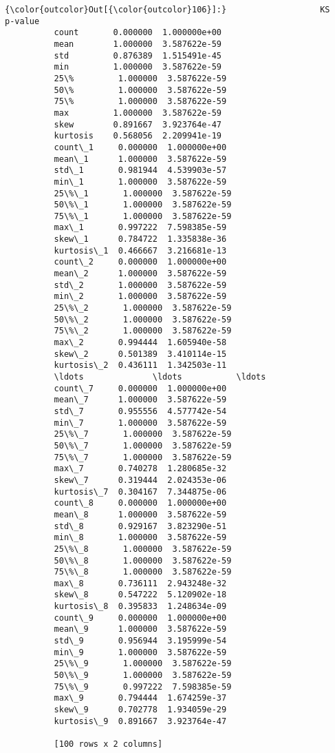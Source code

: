             \begin{Verbatim}[commandchars=\\\{\}]
{\color{outcolor}Out[{\color{outcolor}106}]:}                   KS       p-value
          count       0.000000  1.000000e+00
          mean        1.000000  3.587622e-59
          std         0.876389  1.515491e-45
          min         1.000000  3.587622e-59
          25\%         1.000000  3.587622e-59
          50\%         1.000000  3.587622e-59
          75\%         1.000000  3.587622e-59
          max         1.000000  3.587622e-59
          skew        0.891667  3.923764e-47
          kurtosis    0.568056  2.209941e-19
          count\_1     0.000000  1.000000e+00
          mean\_1      1.000000  3.587622e-59
          std\_1       0.981944  4.539903e-57
          min\_1       1.000000  3.587622e-59
          25\%\_1       1.000000  3.587622e-59
          50\%\_1       1.000000  3.587622e-59
          75\%\_1       1.000000  3.587622e-59
          max\_1       0.997222  7.598385e-59
          skew\_1      0.784722  1.335838e-36
          kurtosis\_1  0.466667  3.216681e-13
          count\_2     0.000000  1.000000e+00
          mean\_2      1.000000  3.587622e-59
          std\_2       1.000000  3.587622e-59
          min\_2       1.000000  3.587622e-59
          25\%\_2       1.000000  3.587622e-59
          50\%\_2       1.000000  3.587622e-59
          75\%\_2       1.000000  3.587622e-59
          max\_2       0.994444  1.605940e-58
          skew\_2      0.501389  3.410114e-15
          kurtosis\_2  0.436111  1.342503e-11
          \ldots              \ldots           \ldots
          count\_7     0.000000  1.000000e+00
          mean\_7      1.000000  3.587622e-59
          std\_7       0.955556  4.577742e-54
          min\_7       1.000000  3.587622e-59
          25\%\_7       1.000000  3.587622e-59
          50\%\_7       1.000000  3.587622e-59
          75\%\_7       1.000000  3.587622e-59
          max\_7       0.740278  1.280685e-32
          skew\_7      0.319444  2.024353e-06
          kurtosis\_7  0.304167  7.344875e-06
          count\_8     0.000000  1.000000e+00
          mean\_8      1.000000  3.587622e-59
          std\_8       0.929167  3.823290e-51
          min\_8       1.000000  3.587622e-59
          25\%\_8       1.000000  3.587622e-59
          50\%\_8       1.000000  3.587622e-59
          75\%\_8       1.000000  3.587622e-59
          max\_8       0.736111  2.943248e-32
          skew\_8      0.547222  5.120902e-18
          kurtosis\_8  0.395833  1.248634e-09
          count\_9     0.000000  1.000000e+00
          mean\_9      1.000000  3.587622e-59
          std\_9       0.956944  3.195999e-54
          min\_9       1.000000  3.587622e-59
          25\%\_9       1.000000  3.587622e-59
          50\%\_9       1.000000  3.587622e-59
          75\%\_9       0.997222  7.598385e-59
          max\_9       0.794444  1.674259e-37
          skew\_9      0.702778  1.934059e-29
          kurtosis\_9  0.891667  3.923764e-47

          [100 rows x 2 columns]
\end{Verbatim}

